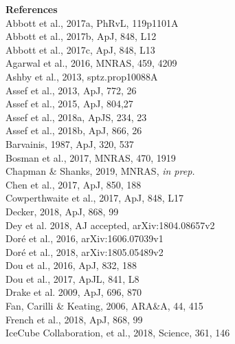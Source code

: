 \documentclass[12pt]{article}
\begin{document}
%
%
%
%
\noindent
\textbf{References} \\
Abbott et al., 2017a,  PhRvL, 119p1101A	\\
Abbott et al., 2017b, ApJ, 848, L12	\\
Abbott et al., 2017c, ApJ, 848, L13	\\
Agarwal et al., 2016,  MNRAS, 459, 4209 \\
Ashby et al., 2013, sptz.prop10088A \\
Assef et al., 2013, ApJ, 772, 26      \\       %
Assef et al., 2015,  ApJ, 804,27 \\            %
Assef et al., 2018a,  ApJS, 234, 23	\\     %
Assef et al., 2018b, ApJ, 866, 26 \\          %
Barvainis, 1987, ApJ, 320, 537 \\
Bosman et al., 2017, MNRAS, 470, 1919 \\
Chapman \& Shanks, 2019, MNRAS, {\it in prep.} \\
Chen et al., 2017, ApJ, 850, 188 \\
Cowperthwaite et al., 2017,  ApJ, 848, L17	\\
Decker, 2018, ApJ, 868, 99 \\	
Dey et al. 2018, AJ accepted, arXiv:1804.08657v2 \\
Dor{\'e} et al., 2016, arXiv:1606.07039v1\\
Dor{\'e} et al., 2018, arXiv:1805.05489v2 \\
Dou et al., 2016, ApJ, 832, 188 \\ 
Dou et al., 2017, ApJL, 841, L8 \\
Drake et al. 2009, ApJ, 696, 870 \\
Fan, Carilli \& Keating, 2006, ARA\&A, 44, 415 \\
French et al., 2018, ApJ, 868, 99 \\
IceCube Collaboration, et al., 2018, Science, 361, 146 \\ 
\end{document}
